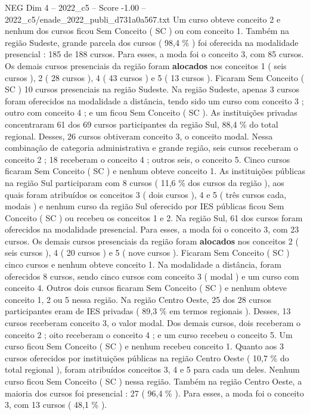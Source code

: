 \begin{textsample}{NEG Dim 4 – 2022\_c5 – Score -1.00 – 2022\_c5/enade\_2022\_publi\_d731a0a567.txt}
Um curso obteve conceito 2 e nenhum dos cursos ficou Sem Conceito ( SC ) ou com conceito 1.
Também na região Sudeste, grande parcela dos cursos ( 98,4 \% ) foi oferecida na modalidade presencial : 185 de 188 cursos.
Para esses, a moda foi o conceito 3, com 85 cursos.
Os demais cursos presenciais da região foram \textbf{alocados} nos conceitos 1 ( seis cursos ), 2 ( 28 cursos ), 4 ( 43 cursos ) e 5 ( 13 cursos ).
Ficaram Sem Conceito ( SC ) 10 cursos presenciais na região Sudeste.
Na região Sudeste, apenas 3 cursos foram oferecidos na modalidade a distância, tendo sido um curso com conceito 3 ; outro com conceito 4 ; e um ficou Sem Conceito ( SC ).
As instituições privadas concentraram 61 dos 69 cursos participantes da região Sul, 88,4 \% do total regional.
Desses, 26 cursos obtiveram conceito 3, o conceito modal.
Nessa combinação de categoria administrativa e grande região, seis cursos receberam o conceito 2 ; 18 receberam o conceito 4 ; outros seis, o conceito 5.
Cinco cursos ficaram Sem Conceito ( SC ) e nenhum obteve conceito 1.
As instituições públicas na região Sul participaram com 8 cursos ( 11,6 \% dos cursos da região ), aos quais foram atribuídos os conceitos 3 ( dois cursos ), 4 e 5 ( três cursos cada, modais ) e nenhum curso da região Sul oferecido por IES públicas ficou Sem Conceito ( SC ) ou recebeu os conceitos 1 e 2.
Na região Sul, 61 dos cursos foram oferecidos na modalidade presencial.
Para esses, a moda foi o conceito 3, com 23 cursos.
Os demais cursos presenciais da região foram \textbf{alocados} nos conceitos 2 ( seis cursos ), 4 ( 20 cursos ) e 5 ( nove cursos ).
Ficaram Sem Conceito ( SC ) cinco cursos e nenhum obteve conceito 1.
Na modalidade a distância, foram oferecidos 8 cursos, sendo cinco cursos com conceito 3 ( modal ) e um curso com conceito 4.
Outros dois cursos ficaram Sem Conceito ( SC ) e nenhum obteve conceito 1, 2 ou 5 nessa região.
Na região Centro Oeste, 25 dos 28 cursos participantes eram de IES privadas ( 89,3 \% em termos regionais ).
Desses, 13 cursos receberam conceito 3, o valor modal.
Dos demais cursos, dois receberam o conceito 2 ; oito receberam o conceito 4 ; e um curso recebeu o conceito 5.
Um curso ficou Sem Conceito ( SC ) e nenhum recebeu conceito 1.
Quanto aos 3 cursos oferecidos por instituições públicas na região Centro Oeste ( 10,7 \% do total regional ), foram atribuídos conceitos 3, 4 e 5 para cada um deles.
Nenhum curso ficou Sem Conceito ( SC ) nessa região.
Também na região Centro Oeste, a maioria dos cursos foi presencial : 27 ( 96,4 \% ).
Para esses, a moda foi o conceito 3, com 13 cursos ( 48,1 \% ).

\end{textsample}
